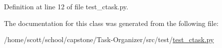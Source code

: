 \-Definition at line 12 of file test\-\_\-ctask.\-py.



\-The documentation for this class was generated from the following file\-:\begin{DoxyCompactItemize}
\item 
/home/scott/school/capstone/\-Task-\/\-Organizer/src/test/\hyperlink{test__ctask_8py}{test\-\_\-ctask.\-py}\end{DoxyCompactItemize}
